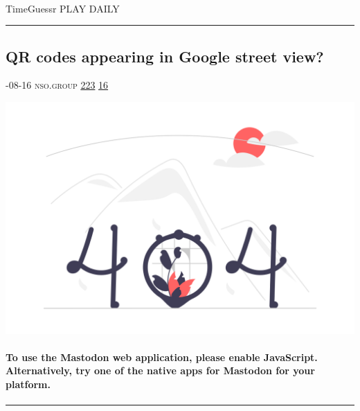 \documentclass[10pt,a4paper]{article}
\begin{document}
\begin{multicols*}{2}
\paragraph{}
TimeGuessr PLAY DAILY
\par\noindent\textcolor{red}{\rule{\linewidth}{0.2mm}}
\vfill
\null
\noindent\begin{minipage}{\linewidth}
\subsection{QR codes appearing in Google street view?}
\textsc{\footnotesize
{\scriptsize\faCalendar}-08-16 
{\scriptsize\faGlobe}\space 
nso.group 
{\scriptsize\faThumbsOUp}\space 
\href{http://news.ycombinator.com/item?id=37155574\&utm\_term=comment}{223} 
{\scriptsize\faComments}\space 
\href{http://news.ycombinator.com/item?id=37155574\&utm\_term=comment}{16} 
}
\par\medskip\noindent
\href{https://nso.group/@haifisch/110901720830132689\#.?utm\_source=hackernewsletter\&utm\_medium=email\&utm\_term=fun}{
    \includegraphics[width=0.99\linewidth]{notfound.png}
}
\end{minipage}
\paragraph{}
\textbf{To use the Mastodon web application, please enable JavaScript. Alternatively, try one of the
native apps
for Mastodon for your platform.}
\paragraph{}

\par\noindent\textcolor{red}{\rule{\linewidth}{0.2mm}}
\vfill
\null
\end{multicols*}

\newpage
\end{document}
